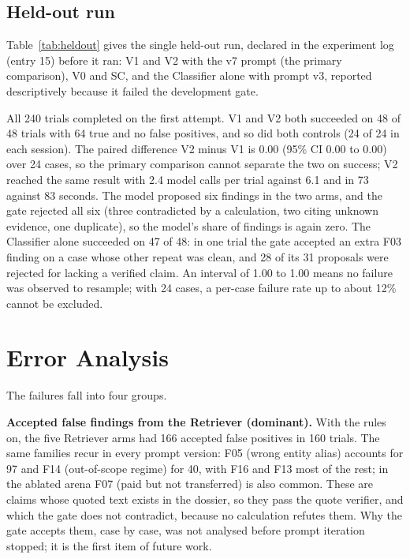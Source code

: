 


\subsection{Held-out run}
Table~\ref{tab:heldout} gives the single held-out run, declared in the experiment log (entry 15)
before it ran: V1 and V2 with the v7 prompt (the primary comparison), V0 and SC, and the
Classifier alone with prompt v3, reported descriptively because it failed the development gate.

\HeldOutTable

All 240 trials completed on the first attempt. V1 and V2 both succeeded on 48 of 48 trials with 64
true and no false positives, and so did both controls (24 of 24 in each session). The paired
difference V2 minus V1 is 0.00 (95\% CI 0.00 to 0.00) over 24 cases, so the primary comparison
cannot separate the two on success; V2 reached the same result with 2.4 model calls per trial against
6.1 and in 73 against 83 seconds. The model proposed six findings in the two arms, and the gate
rejected all six (three contradicted by a calculation, two citing unknown evidence, one duplicate), so
the model's share of findings is again zero. The Classifier alone succeeded on 47 of 48: in one trial
the gate accepted an extra F03 finding on a case whose other repeat was clean, and 28 of its 31
proposals were rejected for lacking a verified claim. An interval of 1.00 to 1.00 means no failure
was observed to resample; with 24 cases, a per-case failure rate up to about 12\% cannot be excluded.

\section{Error Analysis}
The failures fall into four groups.

\textbf{Accepted false findings from the Retriever (dominant).} With the rules on, the five
Retriever arms had 166 accepted false positives in 160 trials. The same families recur in every
prompt version: F05 (wrong entity alias) accounts for 97 and F14 (out-of-scope regime) for 40, with
F16 and F13 most of the rest; in the ablated arena F07 (paid but not transferred) is also common.
These are claims whose quoted text exists in the dossier, so they pass the quote verifier, and which
the gate does not contradict, because no calculation refutes them. Why the gate accepts them, case
by case, was not analysed before prompt iteration stopped; it is the first item of future work.

